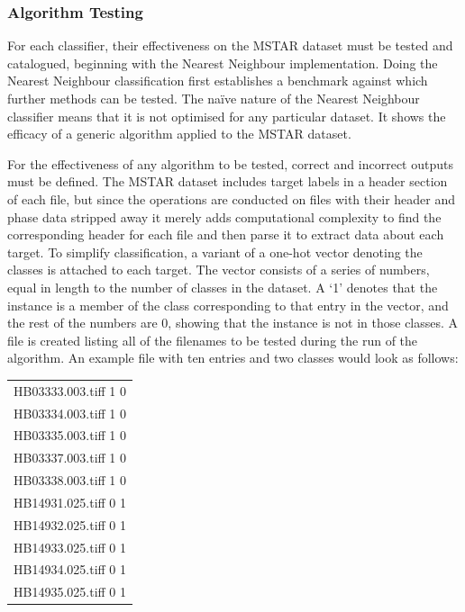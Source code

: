 \subsubsection{Algorithm Testing}
For each classifier, their effectiveness on the MSTAR dataset must be tested and catalogued, beginning with the Nearest Neighbour implementation. Doing the Nearest Neighbour classification first establishes a benchmark against which further methods can be tested. The na{\"i}ve nature of the Nearest Neighbour classifier means that it is not optimised for any particular dataset. It shows the efficacy of a generic algorithm applied to the MSTAR dataset.

For the effectiveness of any algorithm to be tested, correct and incorrect outputs must be defined. The MSTAR dataset includes target labels in a header section of each file, but since the operations are conducted on files with their header and phase data stripped away it merely adds computational complexity to find the corresponding header for each file and then parse it to extract data about each target. 
To simplify classification, a variant of a one-hot vector denoting the classes is attached to each target. The vector consists of a series of numbers, equal in length to the number of classes in the dataset. A `1' denotes that the instance is a member of the class corresponding to that entry in the vector, and the rest of the numbers are 0, showing that the instance is not in those classes. A file is created listing all of the filenames to be tested during the run of the algorithm. An example file with ten entries and two classes would look as follows:\\

\begin{center}
\begin{tabular}{c}
HB03333.003.tiff 1 0 \\
HB03334.003.tiff 1 0 \\
HB03335.003.tiff 1 0 \\
HB03337.003.tiff 1 0 \\
HB03338.003.tiff 1 0 \\
HB14931.025.tiff 0 1 \\
HB14932.025.tiff 0 1 \\
HB14933.025.tiff 0 1 \\
HB14934.025.tiff 0 1 \\
HB14935.025.tiff 0 1 \\


\end{tabular}
\end{center}


